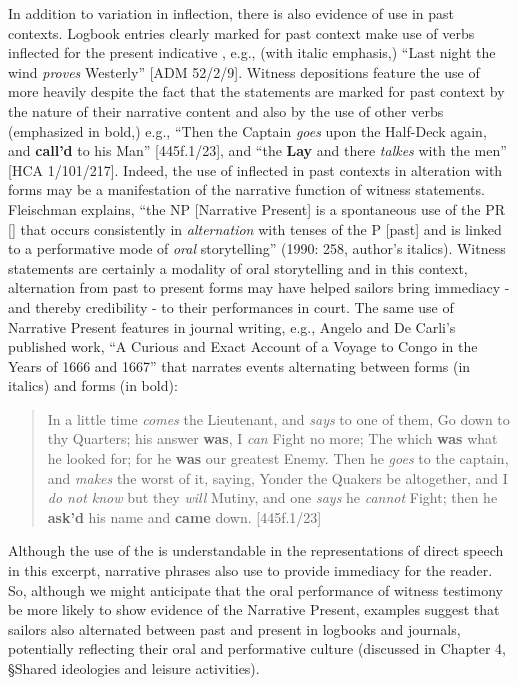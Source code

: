 In addition to variation in  inflection, there is also evidence of  use in past contexts. Logbook entries clearly marked for past context make use of verbs inflected for the present indicative , e.g., (with italic emphasis,) “Last night the wind \textit{proves} Westerly” [ADM 52/2/9]. Witness depositions feature the use of  more heavily despite the fact that the statements are marked for past context by the nature of their narrative content and also by the use of other  verbs (emphasized in bold,) e.g., “Then the Captain \textit{goes} upon the Half-Deck again, and \textbf{call’d} to his Man” [445f.1/23], and “the  \textbf{Lay} and there \textit{talkes} with the men” [HCA 1/101/217]. Indeed, the use of inflected  in past contexts in alteration with  forms may be a manifestation of the narrative function of witness statements. Fleischman explains, “the NP [Narrative Present] is a spontaneous use of the PR [] that occurs consistently in \textit{alternation} with tenses of the P [past] and is linked to a performative mode of \textit{oral} storytelling” (1990: 258, author’s italics). Witness statements are certainly a modality of oral storytelling and in this context, alternation from past to present forms may have helped sailors bring immediacy - and thereby credibility - to their performances in court. The same use of Narrative Present  features in journal writing, e.g., Angelo and De Carli’s published work, “A Curious and Exact Account of a Voyage to Congo in the Years of 1666 and 1667” that narrates events alternating between  forms (in italics) and  forms (in bold):

\begin{quotation}
In a little time \textit{comes} the Lieutenant, and \textit{says} to one of them, Go down to thy Quarters; his answer \textbf{was}, I \textit{can} Fight no more; The which \textbf{was} what he looked for; for he \textbf{was} our greatest Enemy. Then he \textit{goes} to the captain, and \textit{makes} the worst of it, saying, Yonder the Quakers be altogether, and I \textit{do not know} but they \textit{will} Mutiny, and one \textit{says} he \textit{cannot} Fight; then he \textbf{ask’d} his name and \textbf{came} down. [445f.1/23]
\end{quotation}

Although the use of the  is understandable in the representations of direct speech in this excerpt, narrative phrases also use  to provide immediacy for the reader. So, although we might anticipate that the oral performance of witness testimony be more likely to show evidence of the Narrative Present, examples suggest that sailors also alternated between past and present in logbooks and journals, potentially reflecting their oral and performative culture (discussed in Chapter 4, §Shared ideologies and leisure activities). 

